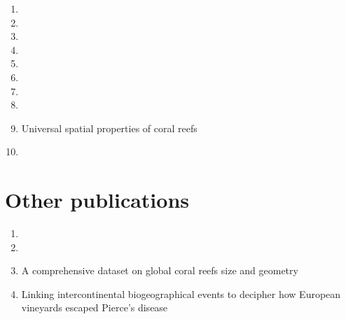 \documentclass[
	10pt, %
	fleqn, %
	a4paper, %
]{LegrandOrangeBook}
\begin{document}
\begin{enumerate}
	\item {}
	      \vspace{0.5 cm}
	\item {}
	      \vspace{0.5 cm}
	\item {}
	      \vspace{0.5 cm}
	\item {}
	      \vspace{0.5 cm}
	\item {}
	      \vspace{0.5 cm}
	\item {}
	      \vspace{0.5 cm}
	\item {}
	      \vspace{0.5 cm}
	\item {}
	      \vspace{0.5 cm}
	\item Universal spatial properties of coral reefs
	      \vspace{0.5cm}
	\item {}
\end{enumerate}

\chapter*{Other publications}

\begin{enumerate}
	\item {}
	      \vspace{0.5 cm}
	\item {}
	      \vspace{0.5 cm}
	\item A comprehensive dataset on global coral reefs size and
	      geometry
	      \vspace{0.5 cm}
	\item Linking intercontinental biogeographical events to decipher how
	      European vineyards escaped Pierce's disease
	      \vspace{0.5 cm}

\end{enumerate}
\end{document}
